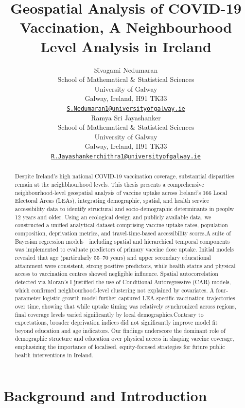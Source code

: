 \documentclass{article}
\title{Geospatial Analysis of COVID-19 Vaccination, A Neighbourhood
Level Analysis in Ireland}
\author{
    Sivagami Nedumaran
   \\
    School of Mathematical \& Statistical Sciences \\
    University of Galway \\
  Galway, Ireland, H91 TK33 \\
  \texttt{\href{mailto:S.Nedumaran1@universityofgalway.ie}{\nolinkurl{S.Nedumaran1@universityofgalway.ie}}} \\
   \And
    Ramya Sri Jayashanker
   \\
    School of Mathematical \& Statistical Sciences \\
    University of Galway \\
  Galway, Ireland, H91 TK33 \\
  \texttt{\href{mailto:R.Jayashankerchithra1@universityofgalway.ie}{\nolinkurl{R.Jayashankerchithra1@universityofgalway.ie}}} \\
  }
\begin{document}
\maketitle


\begin{abstract}
Despite Ireland's high national COVID-19 vaccination coverage,
substantial disparities remain at the neighbhourhood levels. This thesis
presents a comprehensive neighbourhood-level geospatial analysis of
vaccine uptake across Ireland's 166 Local Electoral Areas (LEAs),
integrating demographic, spatial, and health service accessibility data
to identify structural and socio-demographic determinants in peoplw 12
years and older. Using an ecological design and publicly available data,
we constructed a unified analytical dataset comprising vaccine uptake
rates, population composition, deprivation metrics, and
travel-time-based accessibility scores.A suite of Bayesian regression
models---including spatial and hierarchical temporal components---was
implemented to evaluate predictors of primary vaccine dose uptake.
Initial models revealed that age (particularly 55--70 years) and upper
secondary educational attainment were consistent, strong positive
predictors, while health status and physical access to vaccination
centres showed negligible influence. Spatial autocorrelation detected
via Moran's I justified the use of Conditional Autoregressive (CAR)
models, which confirmed neighbourhood-level clustering not explained by
covariates. A four-parameter logistic growth model further captured
LEA-specific vaccination trajectories over time, showing that while
uptake timing was relatively synchronized across regions, final coverage
levels varied significantly by local demographics.Contrary to
expectations, broader deprivation indices did not significantly improve
model fit beyond education and age indicators. Our findings underscore
the dominant role of demographic structure and education over physical
access in shaping vaccine coverage, emphasizing the importance of
localised, equity-focused strategies for future public health
interventions in Ireland.
\end{abstract}


\section{Background and Introduction}\label{background-and-introduction}
\end{document}

